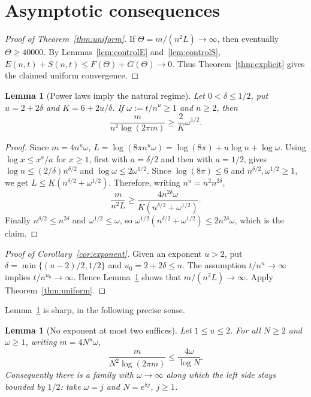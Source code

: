 \documentclass[11pt,reqno]{amsart}
\theoremstyle{plain}
\newtheorem{lemma}[theorem]{Lemma}
\theoremstyle{definition}
\theoremstyle{remark}
\begin{document}
\section{Asymptotic consequences}\label{sec:asymptotic}

\begin{proof}[Proof of Theorem~\ref{thm:uniform}]
If \(\Theta=m/(n^2L)\to\infty\), then eventually \(\Theta\ge40000\). By
Lemmas~\ref{lem:controlE} and~\ref{lem:controlS},
\(E(n,t)+S(n,t)\le F(\Theta)+G(\Theta)\to0\). Thus
Theorem~\ref{thm:explicit} gives the claimed uniform convergence.
\end{proof}

\begin{lemma}[Power laws imply the natural regime]\label{lem:powerlaw}
Let \(0<\delta\le1/2\), put \(u=2+2\delta\) and \(K=6+2u/\delta\). If
\(\omega:=t/n^u\ge1\) and \(n\ge2\), then
\[
  \frac m{n^2\log(2\pi m)}\ge\frac2K\omega^{1/2}.
\]
\end{lemma}

\begin{proof}
Since \(m=4n^u\omega\),
\(L=\log(8\pi n^u\omega)=\log(8\pi)+u\log n+\log\omega\). Using
\(\log x\le x^a/a\) for \(x\ge1\), first with \(a=\delta/2\) and then with
\(a=1/2\), gives \(\log n\le(2/\delta)n^{\delta/2}\) and
\(\log\omega\le2\omega^{1/2}\). Since \(\log(8\pi)\le6\) and
\(n^{\delta/2},\omega^{1/2}\ge1\), we get
\(L\le K(n^{\delta/2}+\omega^{1/2})\). Therefore, writing
\(n^u=n^2n^{2\delta}\),
\[
  \frac m{n^2L}\ge\frac{4n^{2\delta}\omega}{K(n^{\delta/2}+\omega^{1/2})}.
\]
Finally \(n^{\delta/2}\le n^{2\delta}\) and \(\omega^{1/2}\le\omega\), so
\(\omega^{1/2}(n^{\delta/2}+\omega^{1/2})\le2n^{2\delta}\omega\), which is the
claim.
\end{proof}

\begin{proof}[Proof of Corollary~\ref{cor:exponent}]
Given an exponent \(u>2\), put \(\delta=\min\{(u-2)/2,1/2\}\) and
\(u_0=2+2\delta\le u\). The assumption \(t/n^u\to\infty\) implies
\(t/n^{u_0}\to\infty\). Hence Lemma~\ref{lem:powerlaw} shows that
\(m/(n^2L)\to\infty\). Apply Theorem~\ref{thm:uniform}.
\end{proof}

Lemma~\ref{lem:powerlaw} is sharp, in the following precise sense.

\begin{lemma}[No exponent at most two suffices]\label{lem:negative}
Let \(1\le u\le2\). For all \(N\ge2\) and \(\omega\ge1\), writing
\(m=4N^u\omega\),
\begin{equation}\label{eq:negative}
  \frac m{N^2\log(2\pi m)}\le\frac{4\omega}{\log N}.
\end{equation}
Consequently there is a family with \(\omega\to\infty\) along which the left
side stays bounded by \(1/2\): take \(\omega=j\) and \(N=e^{8j}\), \(j\ge1\).
\end{lemma}
\end{document}
